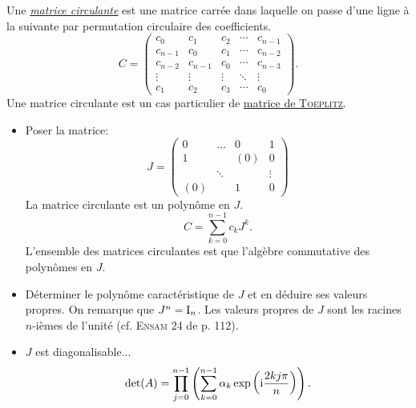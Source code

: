 \begin{tcolorbox}
Une \href{https://fr.wikipedia.org/wiki/Matrice_circulante}{\emph{matrice circulante}} est une matrice carrée dans laquelle on passe d'une ligne à la suivante par permutation circulaire des coefficients. 
$$
    C = \begin{pmatrix}
        c_0 & c_1 & c_2 & \cdots & c_{n-1} \\
        c_{n-1} & c_0 & c_1 & \cdots & c_{n-2} \\
        c_{n-2} & c_{n-1} & c_0 & \cdots & c_{n-3} \\
        \vdots & \vdots & \vdots & \ddots & \vdots \\
        c_1 & c_2 & c_3 & \cdots & c_0
    \end{pmatrix}.
$$
Une matrice circulante est un cas particulier de \href{https://fr.wikipedia.org/wiki/Matrice_de_Toeplitz}{matrice de \textsc{Toeplitz}}.  
\end{tcolorbox}
\begin{itemize}
    \item Poser la matrice:
    $$
    \boxed{
        J=\begin{pmatrix}
            0 & \dots & 0 & 1\\
            1 & & (0) & 0\\
            & \ddots & & \vdots\\
            (0) & & 1 & 0
         \end{pmatrix}
        }
    $$
    La matrice circulante est un polynôme en $J$. 
    $$C = \sum_{k = 0}^{n-1} c_k J^k.$$
    L'ensemble des matrices circulantes est que l'algèbre commutative des polynômes en $J$.
    \item Déterminer le polynôme caractéristique de $J$ et en déduire ses valeurs propres. On remarque que $J^n = \mathrm{I}_n$. Les valeurs propres de $J$ sont les racines $n$-ièmes de l'unité (cf. \textsc{Ensam} 24 de \cite{exos_oraux} p. 112).
    \item $J$ est diagonalisable...
    $$\det(A) = \prod_{j=0}^{n-1} \left( \sum_{k=0}^{n-1} \alpha_k \exp \left( \mathrm{i} \frac{2kj \pi}{n} \right) \right).$$
\end{itemize}